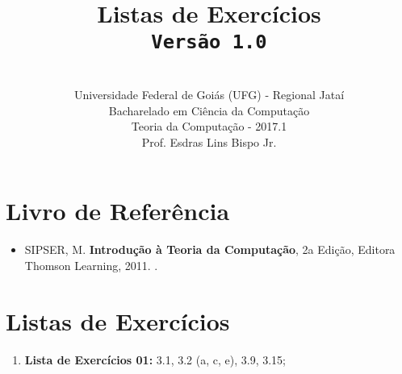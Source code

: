 \documentclass[12pt,a4paper,oneside]{article}
\author{\\Universidade Federal de Goiás (UFG) - Regional Jataí\\Bacharelado em Ciência da Computação \\Teoria da Computação - 2017.1 \\Prof. Esdras Lins Bispo Jr.}
\date{}
\title{
	\sc \huge Listas de Exercícios
	\\{\tt Versão 1.0}
}
\begin{document}
\maketitle

\section{Livro de Referência}
	\begin{itemize}
		\item SIPSER, M. {\bf Introdução à Teoria da Computação}, 2a Edição, Editora Thomson Learning, 2011. \color{blue}{\bf Código Bib.: [004 SIP/int]}.
	\end{itemize}
	
\section{Listas de Exercícios}

\begin{enumerate}

	\item[] {\bf Lista de Exercícios 01:} 3.1, 3.2 (a, c, e), 3.9, 3.15;
	
\end{enumerate}
\end{document}

